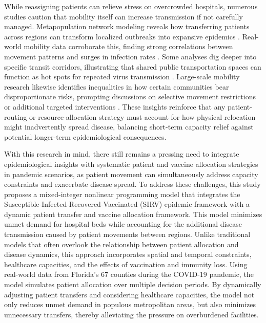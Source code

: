 \documentclass{article}
\begin{document}
While reassigning patients can relieve stress on overcrowded hospitals, numerous studies caution that mobility itself can increase transmission if not carefully managed. Metapopulation network modeling reveals how transferring patients across regions can transform localized outbreaks into expansive epidemics \parencite{calvetti2021modeling}. Real-world mobility data corroborate this, finding strong correlations between movement patterns and surges in infection rates \parencite{badr2020association}. Some analyses dig deeper into specific transit corridors, illustrating that shared public transportation spaces can function as hot spots for repeated virus transmission \parencite{mo2021modeling}. Large-scale mobility research likewise identifies inequalities in how certain communities bear disproportionate risks, prompting discussions on selective movement restrictions or additional targeted interventions \parencite{chang2021mobility, chang2021supporting}. These insights reinforce that any patient-routing or resource-allocation strategy must account for how physical relocation might inadvertently spread disease, balancing short-term capacity relief against potential longer-term epidemiological consequences.

With this research in mind, there still remains a pressing need to integrate epidemiological insights with systematic patient and vaccine allocation strategies in pandemic scenarios, as patient movement can simultaneously address capacity constraints and exacerbate disease spread. To address these challenges, this study proposes a mixed-integer nonlinear programming model that integrates the Susceptible-Infected-Recovered-Vaccinated (SIRV) epidemic framework with a dynamic patient transfer and vaccine allocation framework. This model minimizes unmet demand for hospital beds while accounting for the additional disease transmission caused by patient movements between regions. Unlike traditional models that often overlook the relationship between patient allocation and disease dynamics, this approach incorporates spatial and temporal constraints, healthcare capacities, and the effects of vaccination and immunity loss. Using real-world data from Florida's 67 counties during the COVID-19 pandemic, the model simulates patient allocation over multiple decision periods. By dynamically adjusting patient transfers and considering healthcare capacities, the model not only reduces unmet demand in populous metropolitan areas, but also minimizes unnecessary transfers, thereby alleviating the pressure on overburdened facilities. 
\end{document}
